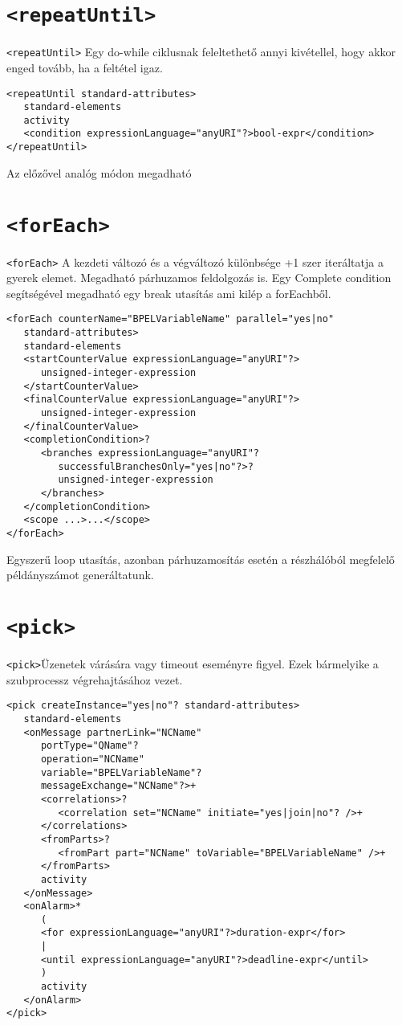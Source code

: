\documentclass[12pt,a4paper]{book}
\begin{document}
\section{\texttt{<repeatUntil>}}
\texttt{<repeatUntil>} Egy do-while ciklusnak feleltethető annyi kivétellel, hogy akkor enged tovább, ha a feltétel igaz. 
\begin{verbatim}
<repeatUntil standard-attributes>
   standard-elements
   activity
   <condition expressionLanguage="anyURI"?>bool-expr</condition>
</repeatUntil>
\end{verbatim}
Az előzővel analóg módon megadható

\section{\texttt{<forEach>}}
\texttt{<forEach>} A kezdeti változó és a végváltozó különbsége +1 szer iteráltatja a gyerek elemet. Megadható párhuzamos feldolgozás is. Egy Complete condition segítségével megadható egy break utasítás ami kilép a forEachből. 
\begin{verbatim}
<forEach counterName="BPELVariableName" parallel="yes|no"
   standard-attributes>
   standard-elements
   <startCounterValue expressionLanguage="anyURI"?>
      unsigned-integer-expression
   </startCounterValue>
   <finalCounterValue expressionLanguage="anyURI"?>
      unsigned-integer-expression
   </finalCounterValue>
   <completionCondition>?
      <branches expressionLanguage="anyURI"?
         successfulBranchesOnly="yes|no"?>?
         unsigned-integer-expression
      </branches>
   </completionCondition>
   <scope ...>...</scope>
</forEach>
\end{verbatim} Egyszerű loop utasítás, azonban párhuzamosítás esetén a részhálóból megfelelő példányszámot generáltatunk. 

\section{\texttt{<pick>}}
\texttt{<pick>}Üzenetek várására vagy timeout eseményre figyel. Ezek bármelyike a szubprocessz végrehajtásához vezet. 
\begin{verbatim}
<pick createInstance="yes|no"? standard-attributes>
   standard-elements
   <onMessage partnerLink="NCName"
      portType="QName"?
      operation="NCName"
      variable="BPELVariableName"?
      messageExchange="NCName"?>+
      <correlations>?
         <correlation set="NCName" initiate="yes|join|no"? />+
      </correlations>
      <fromParts>?
         <fromPart part="NCName" toVariable="BPELVariableName" />+
      </fromParts>
      activity
   </onMessage>
   <onAlarm>*
      (
      <for expressionLanguage="anyURI"?>duration-expr</for>
      |
      <until expressionLanguage="anyURI"?>deadline-expr</until>
      )
      activity
   </onAlarm>
</pick>
\end{verbatim}
\end{document}

